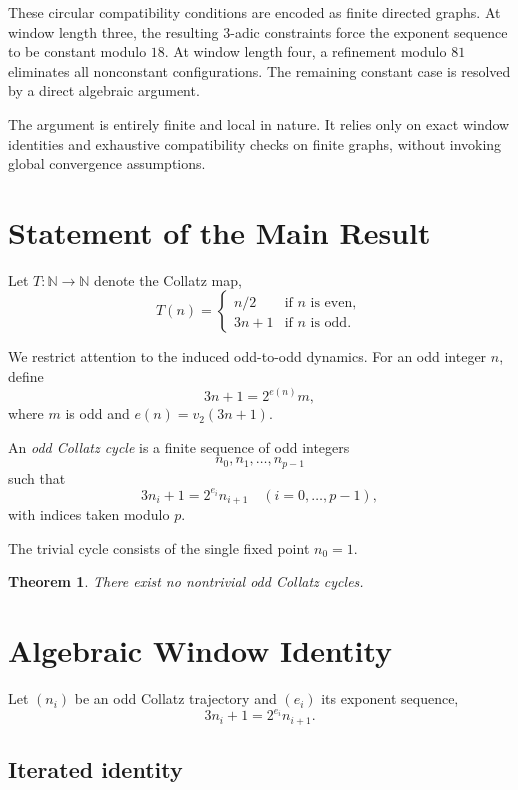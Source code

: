 \documentclass[11pt]{article}
\theoremstyle{definition}
\theoremstyle{plain}
\newtheorem{theorem}{Theorem}[section]
\theoremstyle{remark}
\begin{document}
These circular compatibility conditions are encoded as finite directed graphs.
At window length three, the resulting $3$-adic constraints force the exponent
sequence to be constant modulo $18$.
At window length four, a refinement modulo $81$ eliminates all nonconstant
configurations.
The remaining constant case is resolved by a direct algebraic argument.

The argument is entirely finite and local in nature. It relies only on exact
window identities and exhaustive compatibility checks on finite graphs,
without invoking global convergence assumptions.

\section{Statement of the Main Result}\label{sec:main}

Let $T\colon\mathbb{N}\to\mathbb{N}$ denote the Collatz map,
\[
T(n)=
\begin{cases}
n/2 & \text{if } n \text{ is even},\\
3n+1 & \text{if } n \text{ is odd}.
\end{cases}
\]

We restrict attention to the induced odd-to-odd dynamics.
For an odd integer $n$, define
\[
3n+1 = 2^{e(n)} m,
\]
where $m$ is odd and $e(n)=v_2(3n+1)$.

An \emph{odd Collatz cycle} is a finite sequence of odd integers
\[
n_0,n_1,\dots,n_{p-1}
\]
such that
\[
3n_i+1=2^{e_i}n_{i+1}
\quad (i=0,\dots,p-1),
\]
with indices taken modulo $p$.

The trivial cycle consists of the single fixed point $n_0=1$.

\begin{theorem}
There exist no nontrivial odd Collatz cycles.
\end{theorem}

\section{Algebraic Window Identity}\label{sec:algebraic-w-ident}

Let $(n_i)$ be an odd Collatz trajectory and $(e_i)$ its exponent sequence,
\[
3n_i+1 = 2^{e_i} n_{i+1}.
\]

\subsection{Iterated identity}
\end{document}
